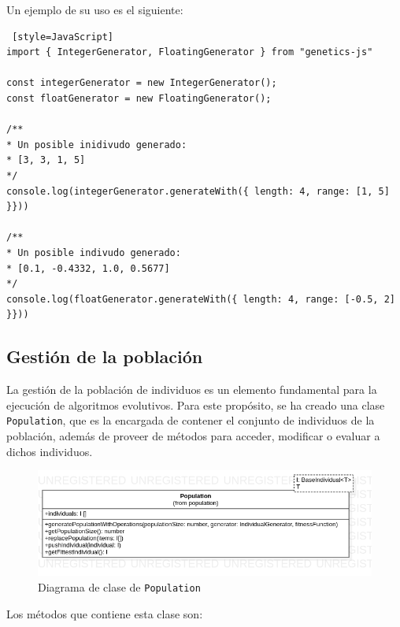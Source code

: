 Un ejemplo de su uso es el siguiente: \\

\begin{lstlisting} [style=JavaScript]
import { IntegerGenerator, FloatingGenerator } from "genetics-js"

const integerGenerator = new IntegerGenerator();
const floatGenerator = new FloatingGenerator();

/**
* Un posible inidivudo generado:
* [3, 3, 1, 5]
*/
console.log(integerGenerator.generateWith({ length: 4, range: [1, 5] }}))

/**
* Un posible indivudo generado:
* [0.1, -0.4332, 1.0, 0.5677]
*/
console.log(floatGenerator.generateWith({ length: 4, range: [-0.5, 2] }}))
\end{lstlisting}

\subsection{Gestión de la población}

La gestión de la población de individuos es un elemento fundamental para la ejecución de algoritmos evolutivos. Para este propósito, se ha creado una clase \texttt{Population}, que es la encargada de contener el conjunto de individuos de la población, además de proveer de métodos para acceder, modificar o evaluar a dichos individuos. \\

\begin{figure}[ht]
    \centering
    \includegraphics[scale=0.6]{mem/images/cap-4/4.2.4(Population)/Population.png}
    \caption{Diagrama de clase de \texttt{Population}}
    \label{fig:generator-uml}
\end{figure}


Los métodos que contiene esta clase son:

